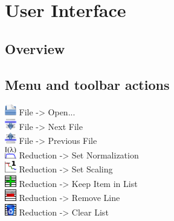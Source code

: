 \chapter{User Interface}
\label{chap:user_interface}

\section{Overview}

\section{Menu and toolbar actions}
  
  \begin{description}
   \item[{\includegraphics[width=0.5cm]{../../icons/document-open.png} File -> Open...}] 
   \item[{\includegraphics[width=0.5cm]{../../icons/listDown.png} File -> Next File}] 
   \item[{\includegraphics[width=0.5cm]{../../icons/listUp.png} File -> Previous File}] 
   
   \item[{\includegraphics[width=0.5cm]{../../icons/extractNormalization.png} Reduction -> Set Normalization}] 
   \item[{\includegraphics[width=0.5cm]{../../icons/totalReflection.png} Reduction -> Set Scaling}] 
   
   \item[{\includegraphics[width=0.5cm]{../../icons/addRef.png} Reduction -> Keep Item in List}] 
   \item[{\includegraphics[width=0.5cm]{../../icons/delRef.png} Reduction -> Remove Line}] 
   \item[{\includegraphics[width=0.5cm]{../../icons/clearRef.png} Reduction -> Clear List}] 


\end{description}
